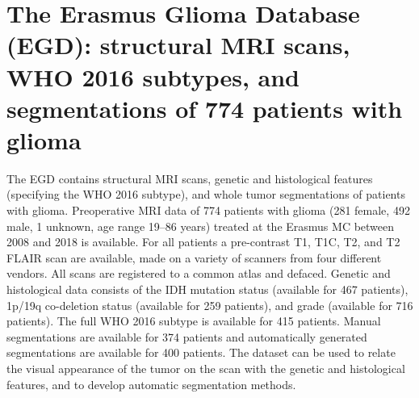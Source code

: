 
\chapter[The Erasmus Glioma Database (EGD): structural MRI scans, WHO 2016 subtypes, and segmentations of 774 patients with glioma][Erasmus Glioma Database]{The Erasmus Glioma Database (EGD): structural MRI scans, WHO 2016 subtypes, and segmentations of 774 patients with glioma}\label{chap:EGD}



\begin{ChapterAbstract}
The \gls{EGD} contains structural \gls{MRI} scans, genetic and histological features (specifying the \acrshort{WHO} 2016 subtype), and whole \gls{tumor} segmentations of patients with glioma.
Preoperative \gls{MRI} data of 774 patients with glioma (281 female, 492 male, 1 unknown, age range 19--86 years) treated at the Erasmus MC between 2008 and 2018 is available.
For all patients a pre-contrast \acrlong{T1}, \acrlong{T1C}, \acrlong{T2}, and \acrlong{T2} FLAIR scan are available, made on a variety of scanners from four different vendors.
All scans are registered to a common atlas and defaced.
Genetic and histological data consists of the \acrshort{IDH} mutation status (available for 467 patients), 1p/19q co-deletion status (available for 259 patients), and grade (available for 716 patients).
The full \acrshort{WHO} 2016 subtype is available for 415 patients.
Manual segmentations are available for 374 patients and automatically generated segmentations are available for 400 patients.
The dataset can be used to relate the visual appearance of the \gls{tumor} on the scan with the genetic and histological features, and to develop automatic segmentation methods.
\end{ChapterAbstract}

